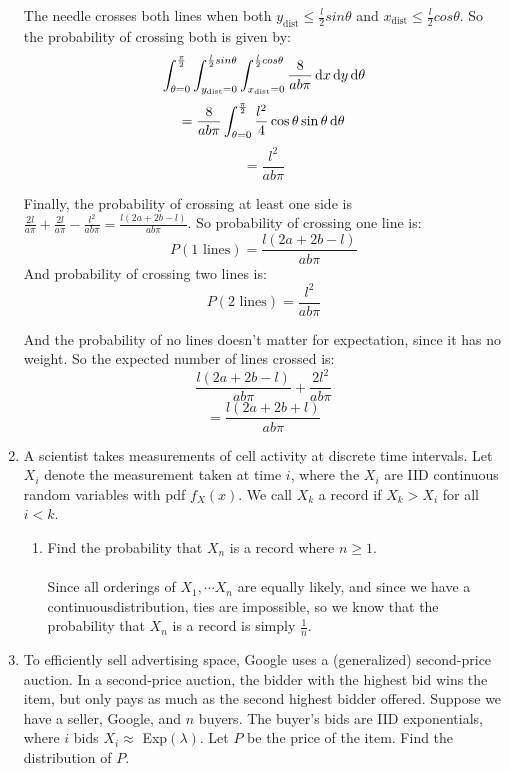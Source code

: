 \begin{enumerate}
    The needle crosses both lines when both $y_{\text{dist}} \leq \frac{l}{2} sin \theta$ and $x_{\text{dist}} \leq \frac{l}{2} cos \theta$. So the probability of crossing both is given by:
    $$\int_{\theta = 0}^{\frac{\pi}{2}} \int_{y_{\text{dist}} = 0}^{\frac{l}{2} sin \theta} \int_{x_{\text{dist}} = 0}^{\frac{l}{2} cos \theta} \frac{8}{ab\pi} \operatorname{d}\!{x} \operatorname{d}\!{y} \operatorname{d}\!{\theta}$$
    $$= \frac{8}{ab\pi} \int_{\theta = 0}^{\frac{\pi}{2}} \frac{l^2}{4} \cos\theta \sin\theta \operatorname{d}\!{\theta}$$
    $$= \frac{l^2}{ab\pi}$$

    Finally, the probability of crossing at least one side is $\frac{2l}{a\pi} + \frac{2l}{a\pi} - \frac{l^2}{ab\pi} = \frac{l(2a + 2b - l)}{ab\pi}$.
    So probability of crossing one line is:
    $$P(1 \text{ lines}) = \frac{l(2a + 2b - l)}{ab\pi}$$
    And probability of crossing two lines is:
    $$P(2 \text{ lines}) = \frac{l^2}{ab\pi}$$

    And the probability of no lines doesn't matter for expectation, since it has no weight. So the expected number of lines crossed is:
    $$\frac{l(2a + 2b - l)}{ab\pi} + \frac{2l^2}{ab\pi}$$
    $$= \frac{l(2a + 2b + l)}{ab\pi}$$


  \item A scientist takes measurements of cell activity at discrete time intervals. Let $X_i$ denote the measurement taken at time $i$, where the $X_i$ are IID continuous random variables with pdf $f_X(x)$. We call $X_k$ a record if $X_k > X_i$ for all $i < k$.

    \begin{enumerate}
      \item Find the probability that $X_n$ is a record where $n \geq 1$.\\\\

        Since all orderings of $X_1, \cdots X_n$ are equally likely, and since we have a continuousdistribution, ties are impossible, so we know that the probability that $X_n$ is a record is simply $\frac{1}{n}$.
    \end{enumerate}


  \item To efficiently sell advertising space, Google uses a (generalized) second-price auction. In a second-price auction, the bidder with the highest bid wins the item, but only pays as much as the second highest bidder offered. Suppose we have a seller, Google, and $n$ buyers. The buyer's bids are IID exponentials, where $i$ bids $X_i \approx $ Exp$(\lambda)$. Let $P$ be the price of the item. Find the distribution of $P$.\\\\


\end{enumerate}
